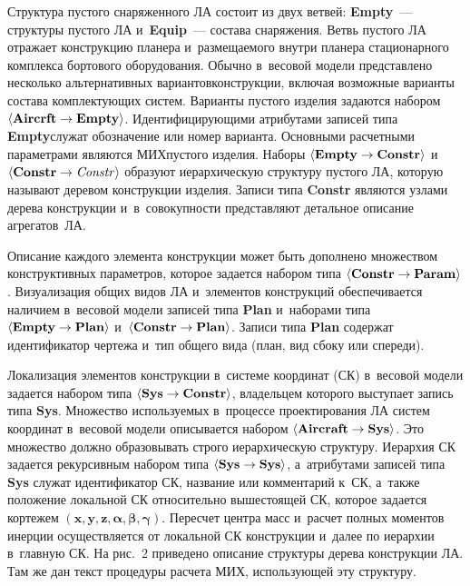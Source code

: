 \begin{multicols}{2}
  Структура пустого снаряженного ЛА состоит из двух ветвей: 
\textbf{Empty}~--- структуры пустого ЛА и~\textbf{Equip}~--- 
состава снаряжения. Ветвь пустого ЛА отражает конструкцию планера 
и~размещаемого внут\-ри планера стационарного комплекса бортового 
оборудования. Обычно в~весовой модели пред\-став\-ле\-но несколько 
альтернативных вариантов\linebreak конструкции, включая возможные варианты состава 
комплектующих систем. Варианты пустого изделия задаются набором $\langle \mbox{\textbf{Aircrft}}\hm\to
\mbox{\textbf{Empty}}\rangle$. 
Идентифицирующими атрибутами записей типа \textbf{Empty}\linebreak служат 
обозначение или номер варианта. Основ\-ными расчетными па\-ра\-мет\-ра\-ми 
являются МИХ\linebreak пустого изделия. Наборы $\langle\mbox{\textbf{Empty}}\hm \to\mbox{\textbf{Constr}}\rangle$ 
и~$\langle\mbox{\textbf{Constr}} \hm\to \mbox{\textit{Constr}}\rangle$
образуют иерархическую 
\mbox{структуру} пус\-то\-го ЛА, которую называют деревом конструкции изделия. 
Записи типа \mbox{\textbf{Constr}} являются узлами дерева конструкции 
и~в~совокупности представляют детальное описание агрегатов~ЛА.
{

}
  
  Описание каждого элемента конструкции может быть дополнено 
множеством конструктивных параметров, которое задается набором типа 
$\langle\mbox{\textbf{Constr}}\hm\to \mbox{\textbf{Param}}\rangle$. Визуализация общих 
видов ЛА и~элементов конструкций обеспечивается наличием в~весовой модели 
записей типа \textbf{Plan} и~наборами типа 
$\langle \mbox{\textbf{Empty}}\hm\to \mbox{\textbf{Plan}}\rangle$ 
и~$\langle \mbox{\textbf{Constr}}\hm\to \mbox{\textbf{Plan}}\rangle$. 
Записи типа \textbf{Plan} содержат идентификатор чертежа и~тип 
общего вида (план, вид сбоку или спереди). 
  
  Локализация элементов конструкции в~системе координат (СК) в~весовой 
модели задается набором типа 
$\langle \mbox{\textbf{Sys}}\hm\to\mbox{\textbf{Constr}}\rangle$, 
владельцем которого выступает запись типа \textbf{Sys}. Множество 
ис\-поль\-зу\-емых в~процессе проектирования ЛА систем координат в~весовой 
модели описывается набором 
$\langle \mbox{\textbf{Aircraft}}\hm \to \mbox{\textbf{Sys}}\rangle$. Это 
множество должно образовывать строго иерархическую структуру. Иерархия 
СК задается рекурсивным набором типа 
$\langle\mbox{\textbf{Sys}}\hm \to \mbox{\textbf{Sys}}\rangle$, 
а~атрибутами записей типа \textbf{Sys} служат идентификатор 
СК, название или комментарий к~СК, а~также 
положение локальной СК относительно вышестоящей СК, которое задается 
кортежем $(\boldsymbol{x}, \boldsymbol{y}, \boldsymbol{z}, \bm{\alpha}, 
\bm{\beta}, \bm{\gamma})$. Пересчет центра масс и~расчет полных моментов 
инерции осуществляется от локальной СК конструкции и~далее по иерархии 
в~главную СК. На рис.~2 приведено описание структуры дерева конструкции ЛА. 
Там же дан текст процедуры расчета МИХ, использующей эту структуру.
  

\end{multicols}
